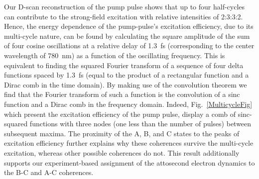 \documentclass[12pt]{article}
\begin{document}
Our D-scan reconstruction of the pump pulse shows that up to four half-cycles can contribute to the strong-field excitation with relative intensities of 2:3:3:2. Hence, the energy dependence of the pump-pulse's excitation efficiency, due to its multi-cycle nature, can be found by calculating the square amplitude of the sum of four cosine oscillations at a relative delay of 1.3~fs (corresponding to the center wavelength of 780~nm) as a function of the oscillating frequency. This is equivalent to finding the squared Fourier transform of a sequence of four delta functions spaced by 1.3~fs (equal to the product of a rectangular function and a Dirac comb in the time domain). By making use of the convolution theorem we find that the Fourier transform of such a function is the convolution of a sinc function and a Dirac comb in the frequency domain. Indeed, Fig.~\ref{MulticycleFig} which present the excitation efficiency of the pump pulse, display a comb of sinc-squared functions with three nodes (one less than the number of pulses) between subsequent maxima. The proximity of the A, B, and C states to the peaks of excitation efficiency further explains why these coherences survive the multi-cycle excitation, whereas other possible coherences do not. This result additionally supports our experiment-based assignment of the attosecond electron dynamics to the B-C and A-C coherences.
\end{document}
